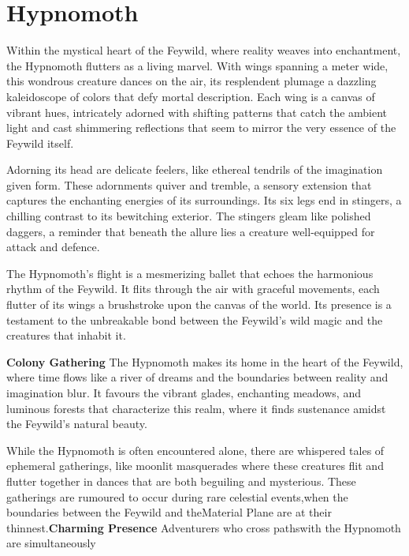\MonsterSheetGeometry

\newcommand{\artPageCounter}{\thepage}

\chapter*{Hypnomoth}\label{monster:Hypnomoth}
\noindent\entryfont Within the mystical heart of the Feywild, where reality weaves into enchantment, the Hypnomoth flutters as a living marvel. With wings spanning a meter wide, this wondrous creature dances on the air, its resplendent plumage a dazzling kaleidoscope of colors that defy mortal description. Each wing is a canvas of vibrant hues, intricately adorned with shifting patterns that catch the ambient light and cast shimmering reflections that seem to mirror the very essence of the Feywild itself.

Adorning its head are delicate feelers, like ethereal tendrils of the imagination given form. These adornments quiver and tremble, a sensory extension that captures the enchanting energies of its surroundings. Its six legs end in stingers, a chilling contrast to its bewitching exterior. The stingers gleam like polished daggers, a reminder that beneath the allure lies a creature well-equipped for attack and defence.

The Hypnomoth's flight is a mesmerizing ballet that echoes the harmonious rhythm of the Feywild. It flits through the air with graceful movements, each flutter of its wings a brushstroke upon the canvas of the world. Its presence is a testament to the unbreakable bond between the Feywild's wild magic and the creatures that inhabit it.

\textbf{Colony Gathering} The Hypnomoth makes its home in the heart of the Feywild, where time flows like a river of dreams and the boundaries between reality and imagination blur. It favours the vibrant glades, enchanting meadows, and luminous forests that characterize this realm, where it finds sustenance amidst the Feywild's natural beauty.

While the Hypnomoth is often encountered alone, there are whispered tales of ephemeral gatherings, like moonlit masquerades where these creatures flit and flutter together in dances that are both beguiling and mysterious. These gatherings are rumoured to occur during rare celestial events,\linebreak\hspace*{2em}when the boundaries between the Feywild and the\linebreak\hspace*{3.5em}Material Plane are at their thinnest.\linebreak\hspace*{5em}\textbf{Charming Presence} Adventurers who cross paths\linebreak\hspace*{6.5em}with the Hypnomoth are simultaneously\linebreak


